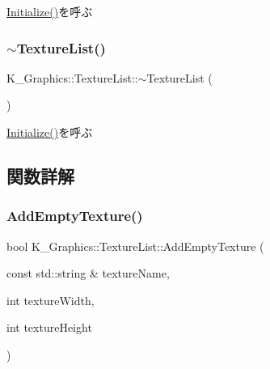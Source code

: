 \mbox{\hyperlink{class_k___graphics_1_1_texture_list_a82c3a0615564dc2f016132b001093014}{Initialize()}}を呼ぶ 

\mbox{\label{class_k___graphics_1_1_texture_list_ad96337c9c60f13d1f6f9e088cab90ffc}} 
\subsubsection{\texorpdfstring{$\sim$\+Texture\+List()}{~TextureList()}}
{\footnotesize\ttfamily K\+\_\+\+Graphics\+::\+Texture\+List\+::$\sim$\+Texture\+List (\begin{DoxyParamCaption}{ }\end{DoxyParamCaption})}



\mbox{\hyperlink{class_k___graphics_1_1_texture_list_a82c3a0615564dc2f016132b001093014}{Initialize()}}を呼ぶ 



\subsection{関数詳解}
\mbox{\label{class_k___graphics_1_1_texture_list_afab7447d6ed329a257436a20aad2cae3}} 
\subsubsection{\texorpdfstring{Add\+Empty\+Texture()}{AddEmptyTexture()}}
{\footnotesize\ttfamily bool K\+\_\+\+Graphics\+::\+Texture\+List\+::\+Add\+Empty\+Texture (\begin{DoxyParamCaption}\item[{const std\+::string \&}]{texture\+Name,  }\item[{int}]{texture\+Width,  }\item[{int}]{texture\+Height }\end{DoxyParamCaption})}




